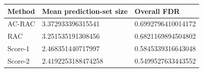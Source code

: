 \begin{tabular}{lll}
\toprule
Method & Mean prediction-set size & Overall FDR \\
\midrule
AC-RAC & 3.372933396315541 & 0.6992796410014172 \\
RAC & 3.251535191308456 & 0.6821169894504802 \\
Score-1 & 2.468351440717997 & 0.5845339316643048 \\
Score-2 & 2.4192253188474258 & 0.5499527633443552 \\
\bottomrule
\end{tabular}
